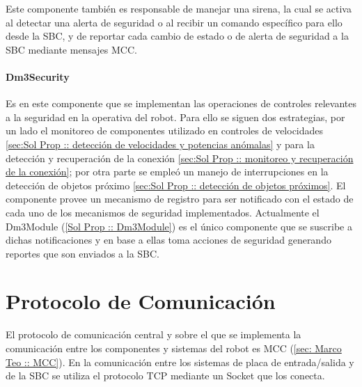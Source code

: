 \documentclass[withindex,glossary]{cam-thesis}
\begin{document}
Este componente también es responsable de manejar una sirena, la cual se activa al detectar una alerta de seguridad o al recibir un comando específico para ello desde la \gls{SBC}, y de reportar cada cambio de estado o de alerta de seguridad a la \gls{SBC} mediante mensajes MCC.


\paragraph{Dm3Security} \label{sec:Sol Prop :: Dm3Security}
Es en este componente que se implementan las operaciones de controles relevantes a la seguridad en la operativa del robot. Para ello se siguen dos estrategias, por un lado el monitoreo de componentes utilizado en controles de velocidades \ref{sec:Sol Prop :: detección de velocidades y potencias anómalas} y para la detección y recuperación de la conexión \ref{sec:Sol Prop :: monitoreo y recuperación de la conexión}; por otra parte se empleó un manejo de interrupciones en la detección de objetos próximo \ref{sec:Sol Prop :: detección de objetos próximos}.
El componente provee un mecanismo de registro para ser notificado con el estado de cada uno de los mecanismos de seguridad implementados. Actualmente el Dm3Module (\ref{Sol Prop :: Dm3Module}) es el único componente que se suscribe a dichas notificaciones y en base a ellas toma acciones de seguridad generando reportes que son enviados a la \gls{SBC}.

\section{Protocolo de Comunicación}
El protocolo de comunicación central y sobre el que se implementa la comunicación entre los componentes y sistemas del robot es MCC (\ref{sec: Marco Teo :: MCC}). En la comunicación entre los sistemas de placa de entrada/salida y de la \gls{SBC} se utiliza el protocolo TCP mediante un \gls{Socket} que los conecta.
\end{document}

